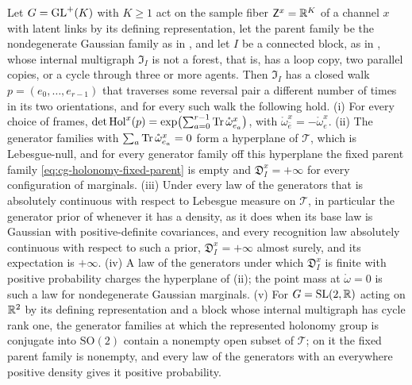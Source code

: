 Let \(G=\mathrm{GL}^+(K)\) with \(K\geq1\) act on the sample fiber \(\mathsf Z^x=\mathbb R^K\) of a channel \(x\) with latent
links by its defining representation, let the parent family be the nondegenerate Gaussian family as in
, and let \(I\) be a connected block, as in
, whose internal multigraph
\(\mathfrak I_I\) is not a forest, that is, has a loop copy, two parallel copies, or a cycle through three or
more agents. Then \(\mathfrak I_I\) has a closed walk \(p=(e_0,\ldots,e_{r-1})\) that traverses some reversal
pair a different number of times in its two orientations, and for every such walk the following hold.
(i) For every choice of frames,
\(\det\mathrm{Hol}^x(p)=\exp\bigl(\sum_{a=0}^{r-1}\operatorname{Tr}\mathring\omega^x_{e_a}\bigr)\), with
\(\mathring\omega^x_{\bar e}=-\mathring\omega^x_e\).
(ii) The generator families with \(\sum_a\operatorname{Tr}\mathring\omega^x_{e_a}=0\) form a hyperplane of \(\mathscr T\), which
is Lebesgue-null, and for every generator family off this hyperplane the fixed parent family
\eqref{eq:cg-holonomy-fixed-parent} is empty and \(\mathfrak D^x_I=+\infty\) for every configuration of
marginals.
(iii) Under every law of the generators that is absolutely continuous with respect to Lebesgue measure on
\(\mathscr T\), in particular the generator prior of  whenever it has a
density, as it does when its base law is Gaussian with positive-definite covariances, and every recognition
law absolutely continuous with respect to such a prior, \(\mathfrak D^x_I=+\infty\) almost surely, and its
expectation is \(+\infty\).
(iv) A law of the generators under which \(\mathfrak D^x_I\) is finite with positive probability charges the
hyperplane of (ii); the point mass at \(\mathring\omega=0\) is such a law for nondegenerate Gaussian
marginals.
(v) For \(G=\mathrm{SL}(2,\mathbb R)\) acting on \(\mathbb R^2\) by its defining representation and a block whose internal
multigraph has cycle rank one, the generator families at which the represented holonomy group is conjugate
into \(\mathrm{SO}(2)\) contain a nonempty open subset of \(\mathscr T\); on it the fixed parent family is
nonempty, and every law of the generators with an everywhere positive density gives it positive
probability. 

